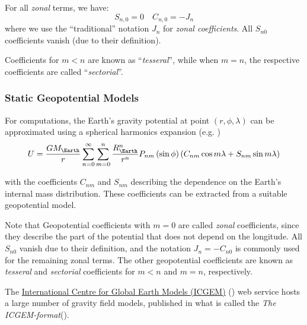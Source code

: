 {For all \emph{zonal} terms, we have:
\begin{equation}
  S_{n,0} = 0 \quad C_{n,0} = -J_n
\end{equation}
where we use the ``traditional'' notation $J_n$ for \emph{zonal coefficients}. 
All $S_{n0}$ coefficients vanish (due to their definition).

Coefficients for $m<n$ are known as ``\emph{tesseral}'', while when $m=n$, the 
respective coefficients are called ``\emph{sectorial}''.


\subsubsection{Static Geopotential Models}
For computations, the Earth's gravity potential at point $(r, \phi , \lambda )$
can be approximated using a spherical harmonics expansion 
(e.g. \cite{Montenbruck2000})
\begin{equation}
    U = \frac{G M_{\Earth}}{r} \sum_{n=0}^\infty \sum_{m=0}^n 
    \frac{R_{\Earth}^n}{r^n} P_{nm} \left( \sin \phi \right) 
    \left( C_{nm} \cos{m\lambda} + S_{nm} \sin{m\lambda} \right)
\end{equation}

with the coefficients \(C_{nm}\) and \(S_{nm}\) describing the dependence on the 
Earth's internal mass distribution. These coefficients can be extracted from a 
suitable geopotential model.

Note that Geopotential coefficients with \(m=0\) are called  \emph{zonal} coefficients, 
since they describe the part of the potential that does not depend on the longitude. 
All \(S_{n0}\) vanish due to their definition, and the notation \(J_n = -C_{n0}\) 
is commonly used for the remaining zonal terms. The other geopotential coefficients
are known as \emph{tesseral} and \emph{sectorial} coefficients for \(m<n\) and 
\(m = n\), respectively.


The \href{http://icgem.gfz-potsdam.de/home}{International Centre for Global Earth Models (ICGEM)}  
(\cite{icgempub}) web service hosts a large number of gravity field models, 
published in what is called the \emph{The ICGEM-format}(\cite{ICGEMFormat}). 

}
